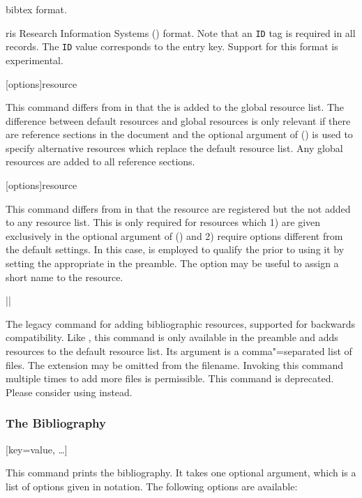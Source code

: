 \documentclass{ltxdockit}[2011/03/25]
\begin{document}
\begin{ltxsyntax}
\begin{optionlist*}
\begin{valuelist}[bibtex]
\item[bibtex] \bibtex format.

\item[ris]\BiberOnlyMark Research Information Systems () format. Note that an \texttt{ID} tag is required in all  records. The \texttt{ID} value corresponds to the entry key. Support for this format is experimental.

\end{valuelist}

\end{optionlist*}

[options]{resource}

This command differs from  in that the  is added to the global resource list. The difference between default resources and global resources is only relevant if there are reference sections in the document and the optional argument of  () is used to specify alternative resources which replace the default resource list. Any global resources are added to all reference sections.

[options]{resource}

This command differs from  in that the resource  are registered but the  not added to any resource list. This is only required for resources which 1) are given exclusively in the optional argument of  () and 2) require options different from the default settings. In this case,  is employed to qualify the  prior to using it by setting the appropriate  in the preamble. The  option may be useful to assign a short name to the resource.

|\DeprecatedMark|

The legacy command for adding bibliographic resources, supported for backwards compatibility. Like , this command is only available in the preamble and adds resources to the default resource list. Its argument is a comma"=separated list of  files. The  extension may be omitted from the filename. Invoking this command multiple times to add more files is permissible. This command is deprecated. Please consider using  instead.

\subsubsection{The Bibliography}
\label{use:bib:bib}

[key=value, \dots]

This command prints the bibliography. It takes one optional argument, which is a list of options given in \keyval notation. The following options are available:

\end{ltxsyntax}
\end{document}

